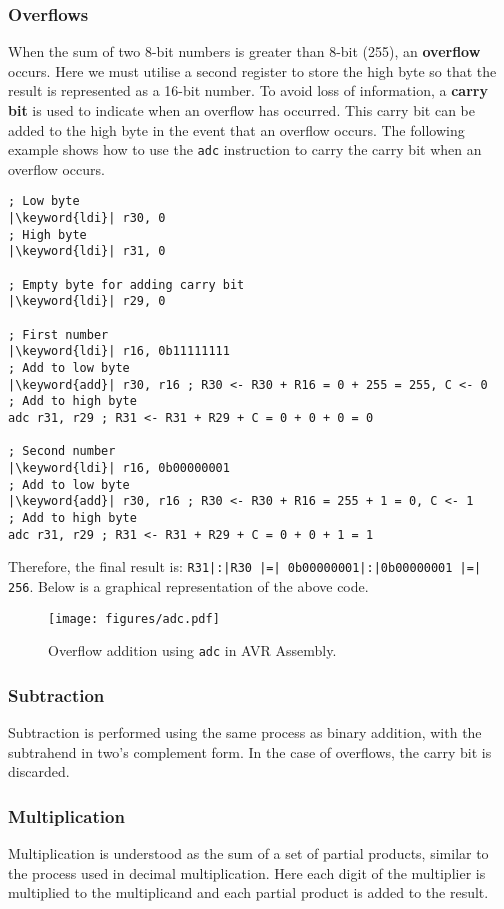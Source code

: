 \documentclass{article}
\newcommand{\keyword}[1]{\textcolor[rgb]{0.00,0.50,0.00}{\textbf{#1}}}
\begin{document}
\subsubsection{Overflows}
When the sum of two 8-bit numbers is greater than 8-bit (255), an
\textbf{overflow} occurs. Here we must utilise a second register to
store the high byte so that the result is represented as a 16-bit
number. To avoid loss of information, a \textbf{carry bit} is used to
indicate when an overflow has occurred. This carry bit can be added to
the high byte in the event that an overflow occurs. The following
example shows how to use the \texttt{adc} instruction to
carry the carry bit when an overflow occurs.
\begin{verbatim}
; Low byte
|\keyword{ldi}| r30, 0
; High byte
|\keyword{ldi}| r31, 0

; Empty byte for adding carry bit
|\keyword{ldi}| r29, 0

; First number
|\keyword{ldi}| r16, 0b11111111
; Add to low byte
|\keyword{add}| r30, r16 ; R30 <- R30 + R16 = 0 + 255 = 255, C <- 0
; Add to high byte
adc r31, r29 ; R31 <- R31 + R29 + C = 0 + 0 + 0 = 0

; Second number
|\keyword{ldi}| r16, 0b00000001
; Add to low byte
|\keyword{add}| r30, r16 ; R30 <- R30 + R16 = 255 + 1 = 0, C <- 1
; Add to high byte
adc r31, r29 ; R31 <- R31 + R29 + C = 0 + 0 + 1 = 1
\end{verbatim}
Therefore, the final result is:
\texttt{R31|:|R30 |=| 0b00000001|:|0b00000001 |=| 256}.
Below is a graphical representation
of the above code.
\begin{figure}[H]
    \centering
    \texttt{[image: figures/adc.pdf]}
    \caption{Overflow addition using \texttt{adc} in AVR Assembly.} %
\end{figure}
\subsubsection{Subtraction}
Subtraction is performed using the same process as binary addition,
with the subtrahend in two's complement form. In the case of overflows,
the carry bit is discarded.
\subsubsection{Multiplication}
Multiplication is understood as the sum of a set of partial products,
similar to the process used in decimal multiplication. Here each digit
of the multiplier is multiplied to the multiplicand and each partial
product is added to the result.
\end{document}
